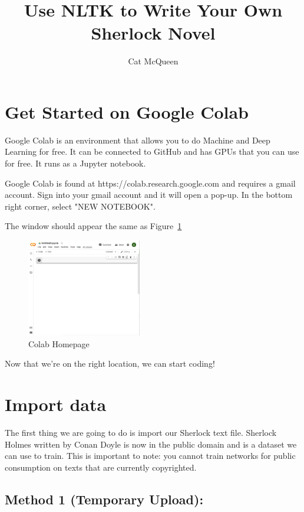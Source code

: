 \documentclass{article}
\title{Use NLTK to Write Your Own Sherlock Novel}
\author{Cat McQueen}
\begin{document}
\maketitle

\tableofcontents

\section{Get Started on Google Colab}

Google Colab is an environment that allows you to do Machine and Deep Learning for free. It can be connected to GitHub and has GPUs that you can use for free. It runs as a Jupyter notebook.

Google Colab is found at https://colab.research.google.com and requires a gmail account. Sign into your gmail account and it will open a pop-up. 
In the bottom right corner, select "NEW NOTEBOOK".

The window should appear the same as Figure~\ref{fig:home}

\begin{figure}[h!]
\centering
\includegraphics[width=50mm]{ColabHome.png}
\caption{Colab Homepage}
\label{fig:home}
\end{figure}

Now that we're on the right location, we can start coding!

\section{Import data}

The first thing we are going to do is import our Sherlock text file. Sherlock Holmes written by Conan Doyle is now in the public domain and is a dataset we can use to train. This is important to note: you cannot train networks for public consumption on texts that are currently copyrighted.

\subsection{Method 1 (Temporary Upload):} 
\end{document}
